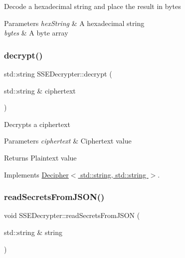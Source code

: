 Decode a hexadecimal string and place the result in {\ttfamily bytes} 
\begin{DoxyParams}{Parameters}
{\em hex\+String} & A hexadecimal string \\
\hline
{\em bytes} & A byte array \\
\hline
\end{DoxyParams}
\mbox{\label{classSSEDecrypter_afc1522b78aed502f8ca94163fc030ffa}} 
\subsubsection{\texorpdfstring{decrypt()}{decrypt()}}
{\footnotesize\ttfamily std\+::string S\+S\+E\+Decrypter\+::decrypt (\begin{DoxyParamCaption}\item[{std\+::string \&}]{ciphertext }\end{DoxyParamCaption})\hspace{0.3cm}{\ttfamily [virtual]}}

Decrypts a ciphertext 
\begin{DoxyParams}{Parameters}
{\em ciphertext} & Ciphertext value \\
\hline
\end{DoxyParams}
\begin{DoxyReturn}{Returns}
Plaintext value 
\end{DoxyReturn}


Implements \hyperlink{classDecipher_ac6b8c369eda2d7e17fa90cb594cf41b6}{Decipher$<$ std\+::string, std\+::string $>$}.

\mbox{\label{classSSEDecrypter_a1bdc685b8ea9c5bcc2b29f0c9a3ca7bf}} 
\subsubsection{\texorpdfstring{read\+Secrets\+From\+J\+S\+O\+N()}{readSecretsFromJSON()}}
{\footnotesize\ttfamily void S\+S\+E\+Decrypter\+::read\+Secrets\+From\+J\+S\+ON (\begin{DoxyParamCaption}\item[{std\+::string \&}]{string }\end{DoxyParamCaption})\hspace{0.3cm}{\ttfamily [virtual]}}

